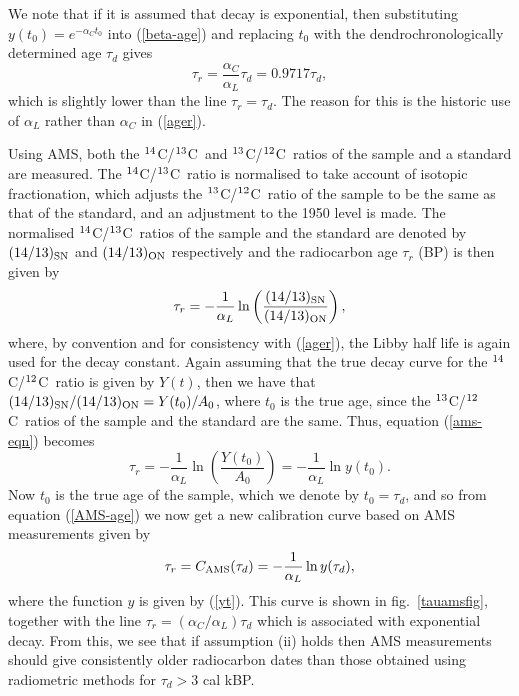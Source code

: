 \documentclass[12pt]{article}
\newcommand{\Ref}[1]{(\ref{#1})}
\newcommand{\cft}{$^{\rm 14}$C}
\newcommand{\cth}{$^{\rm 13}$C}
\newcommand{\ctw}{$^{\rm 12}$C}
\begin{document}
We note that if it is assumed that decay is exponential,
then substituting $y(t_0)=e^{-\alpha_C t_0}$ into \Ref{beta-age} and
replacing $t_0$ with the dendrochronologically determined age $\tau_d$
gives 
$$\tau_r=\frac{\alpha_C}{\alpha_L}\tau_d=0.9717\tau_d,$$ 
which is slightly lower than the line $\tau_r=\tau_d$. The reason for this 
is the historic use of $\alpha_L$ rather than $\alpha_C$ in \Ref{ager}.

Using AMS, both the \cft/\cth~and \cth/\ctw~ratios of the sample and a
standard are measured. The \cft/\cth~ratio is normalised to take account
of isotopic fractionation, which adjusts the \cth/\ctw~ratio of the
sample to be the same as that of the standard, and an adjustment to the 1950
level is made. The normalised \cft/\cth~ratios 
of the sample and the standard are denoted by $(14/13)_{\rm SN}$ and 
$(14/13)_{\rm ON}$ respectively and the radiocarbon age $\tau_r$ (BP) is 
then given by \cite{donahue90}
\begin{equation}\label{ams-eqn}
\tau_r=-\frac{1}{\alpha_L}\ln\left(\frac{(14/13)_{\rm SN}}{(14/13)_{\rm ON}}
\right),
\end{equation}
where, by convention and for consistency with \Ref{ager}, the Libby half life
is again used for the decay constant. Again assuming that the true decay 
curve for the \cft/\ctw~ratio is given by $Y(t)$, then we have that 
$(14/13)_{\rm SN}/(14/13)_{\rm ON}=Y(t_0)/A_0$, where $t_0$ 
is the true age, since the \cth/\ctw~ratios of the sample and the standard
are the same. Thus, equation \Ref{ams-eqn} becomes
\begin{equation}\label{AMS-age}
\tau_r=-\frac{1}{\alpha_L}\ln\left(\frac{Y(t_0)}{A_0}\right)
=-\frac{1}{\alpha_L}\ln y(t_0).
\end{equation}
Now $t_0$ is the true age of the sample, which we denote by $t_0=\tau_d$,
and so from equation \Ref{AMS-age} we now get a new calibration curve
based on AMS measurements given by
\begin{equation}\label{camseqn}
\tau_r=C_{\rm AMS}(\tau_d)=-\frac{1}{\alpha_L}\ln y(\tau_d),
\end{equation}
where the function $y$ is given by \Ref{yt}. This curve is shown in 
fig.~\ref{tauamsfig},
together with the line $\tau_r=(\alpha_C/\alpha_L)\tau_d$ which is 
associated with exponential decay. From this, we see that if
assumption (ii) holds then AMS measurements should give consistently 
older radiocarbon dates than those obtained using radiometric methods for 
$\tau_d>3$ cal kBP. 
\end{document}
